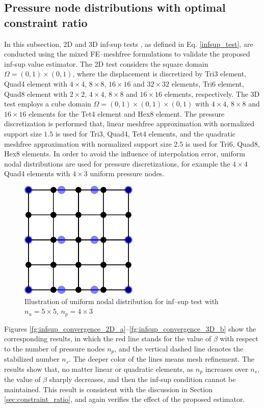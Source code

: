 \subsection{Pressure node distributions with optimal constraint ratio}\label{subsec:optimal_constraint_ratio}

In this subsection, 2D and 3D inf-sup tests \cite{chapelle1993}, as defined in Eq. \ref{infsup_test}, are conducted using the mixed FE–meshfree formulations to validate the proposed inf-sup value estimator.
The 2D test considers the square domain $\Omega = (0,1)\times (0,1)$, where the displacement is discretized by Tri3 element, Quad4 element with $4\times 4$, $8\times 8$, $16\times 16$ and $32\times 32$ elements, Tri6 element, Quad8 element with $2\times 2$, $4\times 4$, $8\times 8$ and $16\times 16$ elements, respectively. The 3D test employs a cube domain $\Omega = (0,1)\times (0,1)\times (0,1)$ with $4\times 4$, $8\times 8$ and $16\times 16$ elements for the Tet4 element and Hex8 element.
The pressure discretization is performed that, linear meshfree approximation with normalized support size $1.5$ is used for Tri3, Quad4, Tet4 elements, and the quadratic meshfree approximation with normalized support size $2.5$ is used for Tri6, Quad8, Hex8 elements.
In order to avoid the influence of interpolation error, uniform nodal distributions are used for pressure discretizations, for example the $4\times4$ Quad4 elements with $4\times3$ uniform pressure nodes.

\begin{figure}[H]
\centering
\includegraphics[width=0.5\textwidth]{pdf/infsup_mesh.pdf}
\caption{Illustration of uniform nodal distribution for inf--sup test with $n_u=5\times5$, $n_p=4\times3$}\label{fg:infsup_mesh}
\end{figure}

Figures \ref{fg:infsup_convergence_2D_a}--\ref{fg:infsup_convergence_3D_b} show the corresponding results, in which the red line stands for the value of $\beta$ with respect to the number of pressure nodes $n_p$, and the vertical dashed line denotes the stabilized number $n_s$. The deeper color of the lines means mesh refinement. The results show that, no matter linear or quadratic elements, as $n_p$ increases over $n_s$, the value of $\beta$ sharply decreases, and then the inf-sup condition cannot be maintained. This result is consistent with the discussion in Section \ref{sec:constraint_ratio}, and again verifies the effect of the proposed estimator.

